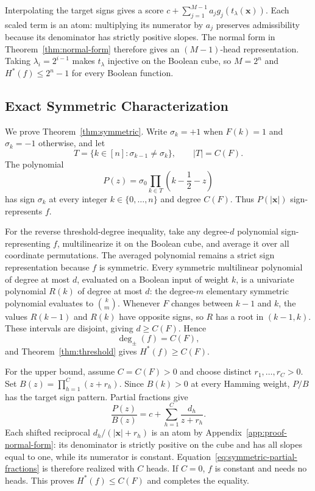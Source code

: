 \documentclass{article}
\theoremstyle{definition}
\theoremstyle{plain}
\newcommand{\hstar}{H^{\ast}}
\newcommand{\tdeg}{\deg_{\pm}}
\newcommand{\signchanges}{C(F)}
\begin{document}
Interpolating the target signs gives a score $c+\sum_{j=1}^{M-1}a_jg_j(t_\lambda(\mathbf{x}))$. Each scaled term is an atom: multiplying its numerator by $a_j$ preserves admissibility because its denominator has strictly positive slopes. The normal form in Theorem~\ref{thm:normal-form} therefore gives an $(M-1)$-head representation. Taking $\lambda_i=2^{i-1}$ makes $t_\lambda$ injective on the Boolean cube, so $M=2^n$ and $\hstar(f)\leq2^n-1$ for every Boolean function.

\subsection{Exact Symmetric Characterization}
\label{app:proof-symmetric}

We prove Theorem~\ref{thm:symmetric}. Write $\sigma_k=+1$ when $F(k)=1$ and $\sigma_k=-1$ otherwise, and let
\begin{equation}
T=\{k\in[n]:\sigma_{k-1}\neq\sigma_k\},
\qquad |T|=\signchanges.
\end{equation}
The polynomial
\begin{equation}
P(z)=\sigma_0\prod_{k\in T}\left(k-\frac12-z\right)
\label{eq:symmetric-sign-polynomial}
\end{equation}
has sign $\sigma_k$ at every integer $k\in\{0,\ldots,n\}$ and degree $\signchanges$. Thus $P(|\mathbf{x}|)$ sign-represents $f$.

For the reverse threshold-degree inequality, take any degree-$d$ polynomial sign-representing $f$, multilinearize it on the Boolean cube, and average it over all coordinate permutations. The averaged polynomial remains a strict sign representation because $f$ is symmetric. Every symmetric multilinear polynomial of degree at most $d$, evaluated on a Boolean input of weight $k$, is a univariate polynomial $R(k)$ of degree at most $d$: the degree-$m$ elementary symmetric polynomial evaluates to $\binom{k}{m}$. Whenever $F$ changes between $k-1$ and $k$, the values $R(k-1)$ and $R(k)$ have opposite signs, so $R$ has a root in $(k-1,k)$. These intervals are disjoint, giving $d\geq\signchanges$. Hence
\begin{equation}
\tdeg(f)=\signchanges,
\end{equation}
and Theorem~\ref{thm:threshold} gives $\hstar(f)\geq\signchanges$.

For the upper bound, assume $C=\signchanges>0$ and choose distinct $r_1,\ldots,r_C>0$. Set $B(z)=\prod_{h=1}^{C}(z+r_h)$. Since $B(k)>0$ at every Hamming weight, $P/B$ has the target sign pattern. Partial fractions give
\begin{equation}
\frac{P(z)}{B(z)}=c+\sum_{h=1}^{C}\frac{d_h}{z+r_h}.
\label{eq:symmetric-partial-fractions}
\end{equation}
Each shifted reciprocal $d_h/(|\mathbf{x}|+r_h)$ is an atom by Appendix~\ref{app:proof-normal-form}: its denominator is strictly positive on the cube and has all slopes equal to one, while its numerator is constant. Equation~\eqref{eq:symmetric-partial-fractions} is therefore realized with $C$ heads. If $C=0$, $f$ is constant and needs no heads. This proves $\hstar(f)\leq\signchanges$ and completes the equality.
\end{document}
